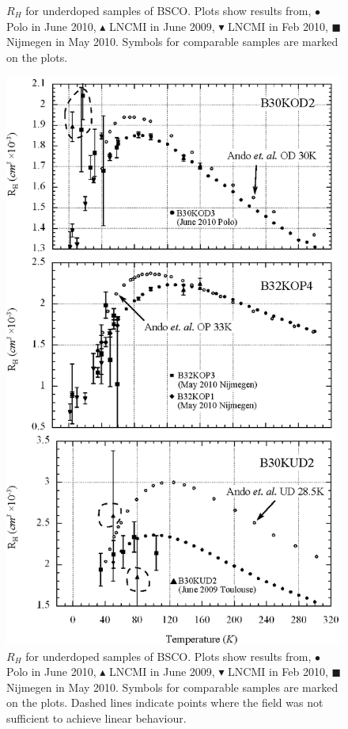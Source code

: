 \begin{figure}[htbp]
\begin{center}
		\caption{$R_H$ for underdoped samples of \ac{BSCO}. Plots show results from, $\bullet$ Polo in June 2010, $\blacktriangle$ \ac{LNCMI} in June 2009, $\blacktriangledown$ \ac{LNCMI} in Feb 2010, $\blacksquare$ Nijmegen in May 2010. Symbols for comparable samples are marked on the plots.}
		\label{Fig:ExpH:HallIndividualOD}
	\end{center}
\end{figure}
\begin{figure}[htbp]
	\begin{center}
		\includegraphics[scale=0.9]{Chapter-HallBSCO/Figures/HallIndividual/HallIndividualOP}
		\caption{$R_H$ for underdoped samples of \ac{BSCO}. Plots show results from, $\bullet$ Polo in June 2010, $\blacktriangle$ \ac{LNCMI} in June 2009, $\blacktriangledown$ \ac{LNCMI} in Feb 2010, $\blacksquare$ Nijmegen in May 2010. Symbols for comparable samples are marked on the plots. Dashed lines indicate points where the field was not sufficient to achieve linear behaviour.}
		\label{Fig:ExpH:HallIndividualOP}
	\end{center}
\end{figure}
